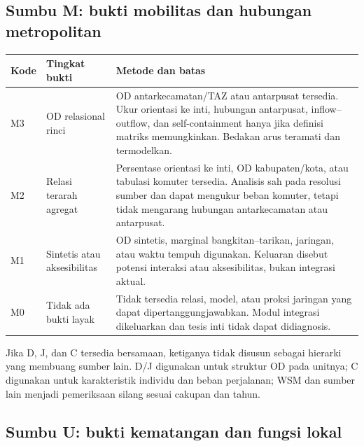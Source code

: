 \documentclass[10pt]{article}
\begin{document}
\subsection{Sumbu M: bukti mobilitas dan hubungan metropolitan}

\begin{tabularx}{\textwidth}{@{}P{0.08\textwidth}P{0.24\textwidth}Y@{}}
\toprule
Kode & Tingkat bukti & Metode dan batas \\
\midrule
M3 & OD relasional rinci & OD antarkecamatan/TAZ atau antarpusat tersedia. Ukur orientasi ke inti, hubungan antarpusat, inflow--outflow, dan self-containment hanya jika definisi matriks memungkinkan. Bedakan arus teramati dan termodelkan. \\
M2 & Relasi terarah agregat & Persentase orientasi ke inti, OD kabupaten/kota, atau tabulasi komuter tersedia. Analisis sah pada resolusi sumber dan dapat mengukur beban komuter, tetapi tidak mengarang hubungan antarkecamatan atau antarpusat. \\
M1 & Sintetis atau aksesibilitas & OD sintetis, marginal bangkitan--tarikan, jaringan, atau waktu tempuh digunakan. Keluaran disebut potensi interaksi atau aksesibilitas, bukan integrasi aktual. \\
M0 & Tidak ada bukti layak & Tidak tersedia relasi, model, atau proksi jaringan yang dapat dipertanggungjawabkan. Modul integrasi dikeluarkan dan tesis inti tidak dapat didiagnosis. \\
\bottomrule
\end{tabularx}

Jika D, J, dan C tersedia bersamaan, ketiganya tidak disusun sebagai hierarki yang membuang sumber lain. D/J digunakan untuk struktur OD pada unitnya; C digunakan untuk karakteristik individu dan beban perjalanan; WSM dan sumber lain menjadi pemeriksaan silang sesuai cakupan dan tahun.

\subsection{Sumbu U: bukti kematangan dan fungsi lokal}
\end{document}
